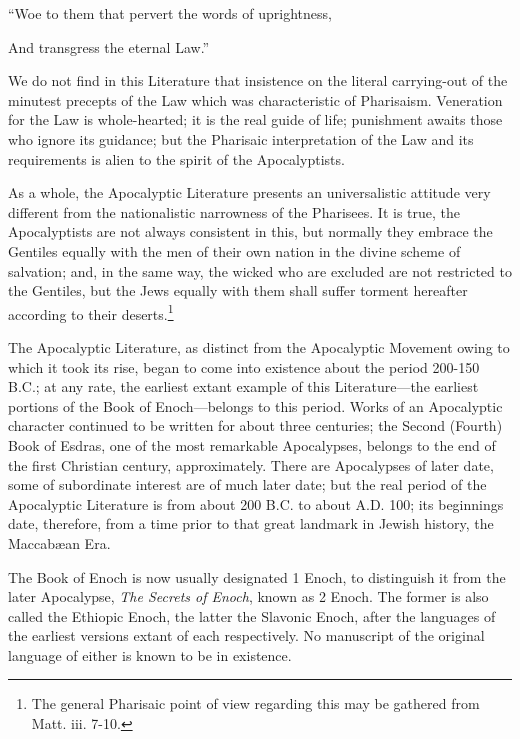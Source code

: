 “Woe to them that pervert the words of uprightness,

And transgress the eternal Law.”

We do not find in this Literature that insistence
on the literal carrying-out of the minutest precepts
of the Law which was characteristic of Pharisaism.
Veneration for the Law is whole-hearted; it is the
real guide of life; punishment awaits those who
ignore its guidance; but the Pharisaic interpretation
of the Law and its requirements is alien to the spirit
of the Apocalyptists.

As a whole, the Apocalyptic Literature presents
an universalistic attitude very different from the
nationalistic narrowness of the Pharisees. It is true,
the Apocalyptists are not always consistent in this,
but normally they embrace the Gentiles equally with
the men of their own nation in the divine scheme of
salvation; and, in the same way, the wicked who are
excluded are not restricted to the Gentiles, but the
Jews equally with them shall suffer torment hereafter
according to their deserts.\footnote{The general Pharisaic point of view regarding this may
be gathered from Matt. iii. 7-10.}

The Apocalyptic Literature, as distinct from the
Apocalyptic Movement owing to which it took its
rise, began to come into existence about the period
200-150 B.C.; at any rate, the earliest extant example
of this Literature—the earliest portions of the Book
of Enoch—belongs to this period. Works of an
Apocalyptic character continued to be written for
about three centuries; the Second (Fourth) Book of
Esdras, one of the most remarkable Apocalypses,
belongs to the end of the first Christian century,
approximately. There are Apocalypses of later date,
some of subordinate interest are of much later date;
but the real period of the Apocalyptic Literature is
from about 200 B.C. to about A.D. 100; its beginnings
date, therefore, from a time prior to that great landmark
in Jewish history, the Maccabæan Era.


The Book of Enoch is now usually designated
1 Enoch, to distinguish it from the later Apocalypse,
\emph{The Secrets of Enoch}, known as 2 Enoch. The
former is also called the Ethiopic Enoch, the latter
the Slavonic Enoch, after the languages of the
earliest versions extant of each respectively. No
manuscript of the original language of either is known
to be in existence.

